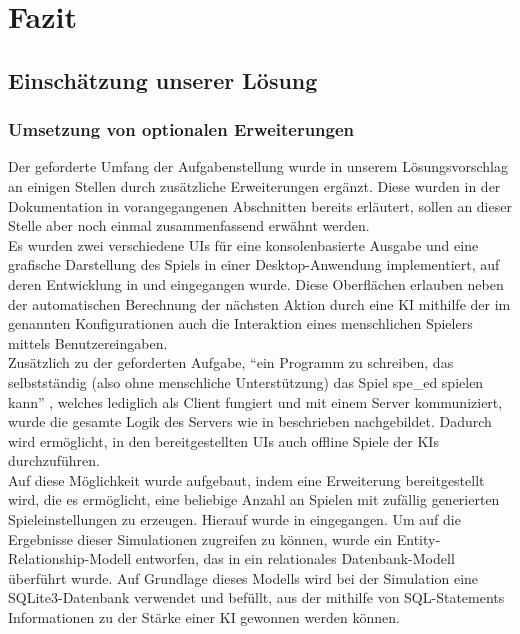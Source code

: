 \chapter{Fazit}
\label{ch:fazit}

\section{Einschätzung unserer Lösung}
\label{sec:einschaetzung}


\subsection{Umsetzung von optionalen Erweiterungen}
\label{subsec:optionale-erweiterungen}

Der geforderte Umfang der Aufgabenstellung  wurde in unserem Lösungsvorschlag an einigen
Stellen durch zusätzliche Erweiterungen ergänzt.
Diese wurden in der Dokumentation in vorangegangenen Abschnitten bereits erläutert, sollen an dieser Stelle aber noch
einmal zusammenfassend erwähnt werden. \\

Es wurden zwei verschiedene \ac{UI}s für eine konsolenbasierte Ausgabe und eine grafische Darstellung des Spiels in
einer Desktop-Anwendung implementiert, auf deren Entwicklung in  und
 eingegangen wurde.
Diese Oberflächen erlauben neben der automatischen Berechnung der nächsten Aktion durch eine \ac{KI} mithilfe der im
 genannten Konfigurationen auch die Interaktion eines menschlichen Spielers mittels
Benutzereingaben. \\

Zusätzlich zu der geforderten Aufgabe, "`ein Programm zu schreiben, das selbstständig (also ohne menschliche
Unterstützung) das Spiel spe\_ed spielen kann"' , welches lediglich als Client fungiert und
mit einem Server kommuniziert, wurde die gesamte Logik des Servers wie in 
beschrieben nachgebildet.
Dadurch wird ermöglicht, in den bereitgestellten \ac{UI}s auch offline Spiele der \ac{KI}s durchzuführen. \\

Auf diese Möglichkeit wurde aufgebaut, indem eine Erweiterung bereitgestellt wird, die es ermöglicht, eine beliebige
Anzahl an Spielen mit zufällig generierten Spieleinstellungen zu erzeugen.
Hierauf wurde in  eingegangen.
Um auf die Ergebnisse dieser Simulationen zugreifen zu können, wurde ein Entity-Relationship-Modell entworfen, das in
ein relationales Datenbank-Modell überführt wurde.
Auf Grundlage dieses Modells wird bei der Simulation eine SQLite3-Datenbank verwendet und befüllt, aus der mithilfe von
SQL-Statements Informationen zu der Stärke einer \ac{KI} gewonnen werden können. \\

